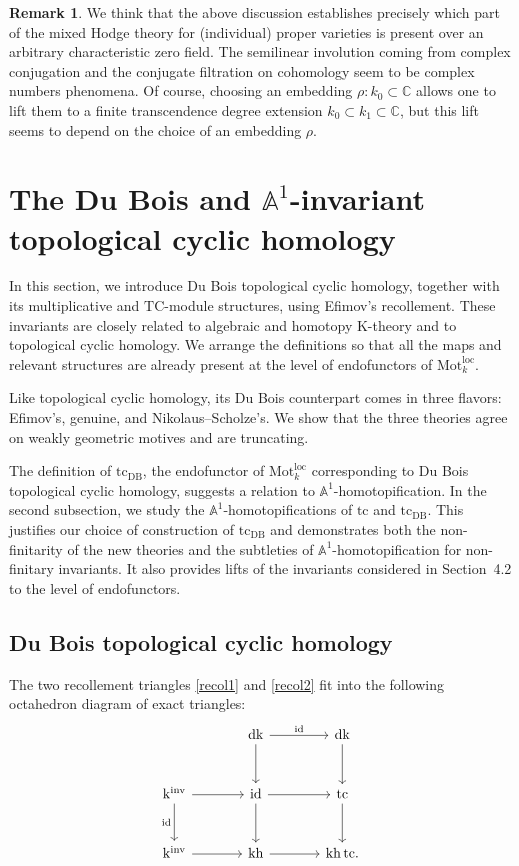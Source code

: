 \documentclass{amsart}
\theoremstyle{plain}
\theoremstyle{definition}
\newtheorem{remark}[prop]{Remark}
\newcommand{\bbA}{\mathbb{A}}
\newcommand{\bbC}{\mathbb{C}}
\newcommand{\Motloc}{\mathrm{Mot}^{\mathrm{loc}}}
\newcommand{\TC}{\mathrm{TC}}
\newcommand{\dk}{\mathrm{dk}}
\newcommand{\kh}{\mathrm{kh}}
\newcommand{\tc}{\mathrm{tc}}
\newcommand{\kinv}{\mathrm{k}^{\mathrm{inv}}}
\DeclareMathOperator{\id}{id}
\newcommand{\DB}{\mathrm{DB}}
\begin{document}
\begin{remark}
We think that the above discussion establishes precisely which part of the mixed Hodge theory for (individual) proper varieties is present over an arbitrary characteristic zero field. The semilinear involution coming from complex conjugation and the conjugate filtration on cohomology seem to be complex numbers phenomena. Of course, choosing an embedding $\rho:k_0\subset \bbC$ allows one to lift them to a finite transcendence degree extension $k_0\subset k_1\subset\bbC$, but this lift seems to depend on the choice of an embedding $\rho$.
\end{remark}



\section{The Du Bois and $\bbA^1$-invariant topological cyclic homology}


In this section, we introduce Du Bois topological cyclic homology, together with its multiplicative and $\TC$-module structures, using Efimov's recollement. These invariants are closely related to algebraic and homotopy K-theory and to topological cyclic homology.
We arrange the definitions so that all the maps and relevant structures are already present at the level of endofunctors of $\Motloc_k$.

Like topological cyclic homology, its Du Bois counterpart comes in three flavors: Efimov's, genuine, and Nikolaus--Scholze's.
We show that the three theories agree on weakly geometric motives and are truncating.

The definition of $\tc_{\DB}$, the endofunctor of $\Motloc_k$
corresponding to Du Bois topological cyclic homology, suggests a relation to $\bbA^1$-homotopification. In the second subsection, we study the $\bbA^1$-homotopifications of $\tc$ and $\tc_{\DB}$.
This justifies our choice of construction of $\tc_{\DB}$ and demonstrates both the non-finitarity of the new theories and the subtleties of $\bbA^1$-homotopification for non-finitary invariants.
It also provides lifts of the invariants considered in Section~4.2 to the level of
endofunctors.


\subsection{Du Bois topological cyclic homology}

The two recollement triangles \eqref{recol1} and \eqref{recol2} fit into the following octahedron diagram of exact triangles:
\begin{equation}\label{eqoctahedronendofunctors}
\begin{tikzcd}[column sep=large,row sep=large]
 & \dk \arrow[r,"\id"] \arrow[d]
 & \dk \arrow[d] \\
\kinv \arrow[r] \arrow[d,"\id"']
 & \id \arrow[r] \arrow[d]
 & \tc \arrow[d] \\
\kinv \arrow[r]
 & \kh \arrow[r]
 & \kh\,\tc .
\end{tikzcd}
\end{equation}
\end{document}
